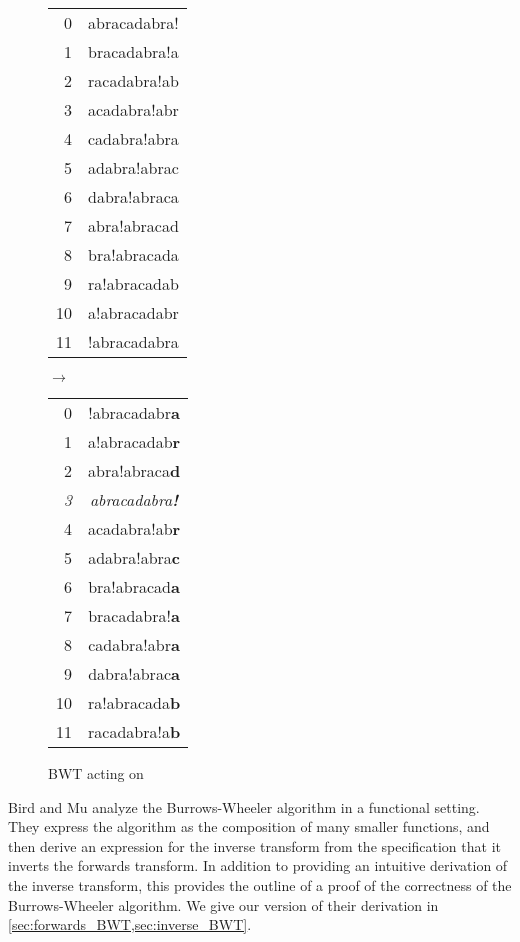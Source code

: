 \documentclass[11pt]{thesis}
\begin{document}
\begin{figure}
  \centering
  \begin{tt}
  \begin{tabular}{rc}
    0  & abracadabra! \\
    1  & bracadabra!a \\
    2  & racadabra!ab \\
    3  & acadabra!abr \\
    4  & cadabra!abra \\
    5  & adabra!abrac \\
    6  & dabra!abraca \\
    7  & abra!abracad \\
    8  & bra!abracada \\
    9  & ra!abracadab \\
    10 & a!abracadabr \\
    11 & !abracadabra
  \end{tabular}
  $\rightarrow$
  \begin{tabular}{rc}
    0  & !abracadabr\textbf{a} \\
    1  & a!abracadab\textbf{r} \\
    2  & abra!abraca\textbf{d} \\
    \textit{3} & \textit{abracadabra\textbf{!}} \\
    4  & acadabra!ab\textbf{r} \\
    5  & adabra!abra\textbf{c} \\
    6  & bra!abracad\textbf{a} \\
    7  & bracadabra!\textbf{a} \\
    8  & cadabra!abr\textbf{a} \\
    9  & dabra!abrac\textbf{a} \\
    10 & ra!abracada\textbf{b} \\
    11 & racadabra!a\textbf{b}
  \end{tabular}
  \end{tt}
  \caption{BWT acting on }
  \label{fig:bw_ex}
\end{figure}

Bird and Mu \cite{birdmu,pearls} analyze the Burrows-Wheeler algorithm
in a functional setting. They express the algorithm as the composition
of many smaller functions, and then derive an expression for the
inverse transform from the specification that it inverts the forwards
transform. In addition to providing an intuitive derivation of the
inverse transform, this provides the outline of a proof of the
correctness of the Burrows-Wheeler algorithm. We give our version of
their derivation in \cref{sec:forwards_BWT,sec:inverse_BWT}.
\end{document}
